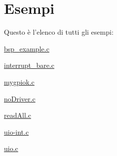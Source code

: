 \section{Esempi}
Questo è l'elenco di tutti gli esempi\+:\begin{DoxyCompactItemize}
\item 
\hyperlink{bsp_example_8c-example}{bsp\+\_\+example.\+c}
\item 
\hyperlink{interrupt_bare_8c-example}{interrupt\+\_\+bare.\+c}
\item 
\hyperlink{mygpiok_8c-example}{mygpiok.\+c}
\item 
\hyperlink{no_driver_8c-example}{no\+Driver.\+c}
\item 
\hyperlink{read_all_8c-example}{read\+All.\+c}
\item 
\hyperlink{uio-int_8c-example}{uio-\/int.\+c}
\item 
\hyperlink{uio_8c-example}{uio.\+c}
\end{DoxyCompactItemize}
